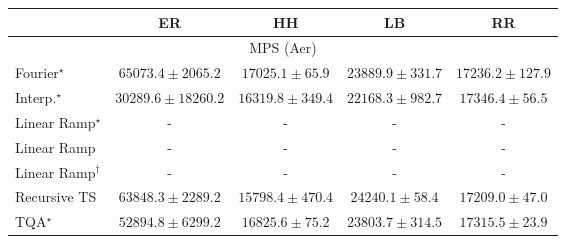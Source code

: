 \begin{tabular}{l|cccc|}
\toprule
            & ER & HH & LB & RR \\
\midrule
\multicolumn{5}{c}{\rule{0pt}{8pt}MPS (Aer)} \\
\midrule
Fourier$^\star$ & {\cellcolor[HTML]{81127E}} \color[HTML]{F1F1F1} $65073.4\pm 2065.2$ & {\cellcolor[HTML]{EFF6FA}} \color[HTML]{000000} $17025.1\pm 65.9$ & {\cellcolor[HTML]{D7E5F0}} \color[HTML]{000000} $23889.9\pm 331.7$ & {\cellcolor[HTML]{EEF6FA}} \color[HTML]{000000} $17236.2\pm 127.9$ \\
Interp.$^\star$ & {\cellcolor[HTML]{BACFE4}} \color[HTML]{000000} $30289.6\pm 18260.2$ & {\cellcolor[HTML]{F1F8FB}} \color[HTML]{000000} $16319.8\pm 349.4$ & {\cellcolor[HTML]{DFEBF4}} \color[HTML]{000000} $22168.3\pm 982.7$ & {\cellcolor[HTML]{EEF6FA}} \color[HTML]{000000} $17346.4\pm 56.5$ \\
Linear Ramp$^\star$ & {\cellcolor[HTML]{000000}} \color[HTML]{F1F1F1} {\cellcolor{white}} \color{black} - & {\cellcolor[HTML]{000000}} \color[HTML]{F1F1F1} {\cellcolor{white}} \color{black} - & {\cellcolor[HTML]{000000}} \color[HTML]{F1F1F1} {\cellcolor{white}} \color{black} - & {\cellcolor[HTML]{000000}} \color[HTML]{F1F1F1} {\cellcolor{white}} \color{black} - \\
Linear Ramp & {\cellcolor[HTML]{000000}} \color[HTML]{F1F1F1} {\cellcolor{white}} \color{black} - & {\cellcolor[HTML]{000000}} \color[HTML]{F1F1F1} {\cellcolor{white}} \color{black} - & {\cellcolor[HTML]{000000}} \color[HTML]{F1F1F1} {\cellcolor{white}} \color{black} - & {\cellcolor[HTML]{000000}} \color[HTML]{F1F1F1} {\cellcolor{white}} \color{black} - \\
Linear Ramp$^\dagger$ & {\cellcolor[HTML]{000000}} \color[HTML]{F1F1F1} {\cellcolor{white}} \color{black} - & {\cellcolor[HTML]{000000}} \color[HTML]{F1F1F1} {\cellcolor{white}} \color{black} - & {\cellcolor[HTML]{000000}} \color[HTML]{F1F1F1} {\cellcolor{white}} \color{black} - & {\cellcolor[HTML]{000000}} \color[HTML]{F1F1F1} {\cellcolor{white}} \color{black} - \\
Recursive TS & {\cellcolor[HTML]{831A83}} \color[HTML]{F1F1F1} $63848.3\pm 2289.2$ & {\cellcolor[HTML]{F3F9FB}} \color[HTML]{000000} $15798.4\pm 470.4$ & {\cellcolor[HTML]{D6E4F0}} \color[HTML]{000000} $24240.1\pm 58.4$ & {\cellcolor[HTML]{EEF6FA}} \color[HTML]{000000} $17209.0\pm 47.0$ \\
TQA$^\star$ & {\cellcolor[HTML]{8B60AC}} \color[HTML]{F1F1F1} $52894.8\pm 6299.2$ & {\cellcolor[HTML]{F0F7FA}} \color[HTML]{000000} $16825.6\pm 75.2$ & {\cellcolor[HTML]{D7E5F0}} \color[HTML]{000000} $23803.7\pm 314.5$ & {\cellcolor[HTML]{EEF6FA}} \color[HTML]{000000} $17315.5\pm 23.9$ \\

\end{tabular}
